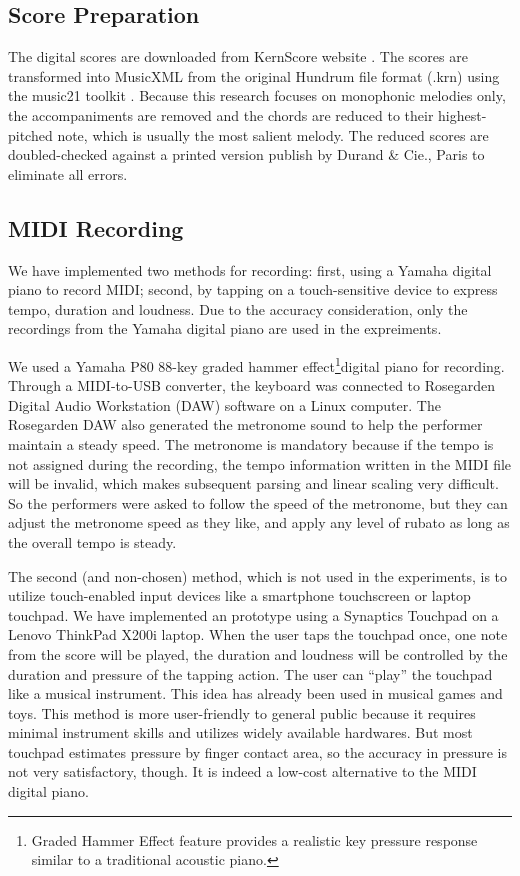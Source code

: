 \subsection{Score Preparation}

The digital scores are downloaded from KernScore website \cite{KernScores}. The  scores are transformed into MusicXML from the original Hundrum file format (.krn) using the  music21 toolkit \cite{music21}. Because this research focuses on monophonic melodies only, the accompaniments are removed and the chords are reduced to their highest-pitched note, which is usually the most salient melody. The reduced scores are doubled-checked against a printed version publish by Durand \& Cie., Paris \cite{Clementi1915} to eliminate all errors. %

\subsection{MIDI Recording}
We have implemented two methods for recording: first, using a Yamaha digital piano to record MIDI; second, by tapping on a touch-sensitive device to express tempo, duration and loudness. Due to the accuracy consideration, only the recordings from the Yamaha digital piano are used in the expreiments.


We used a Yamaha P80 88-key graded hammer effect\footnote{Graded Hammer Effect feature provides a realistic key pressure response similar to a traditional acoustic piano.}digital piano for recording. Through a MIDI-to-USB converter, the keyboard was connected to Rosegarden Digital Audio Workstation (DAW) software on a Linux computer. The Rosegarden DAW also generated the metronome sound to help the performer maintain a steady speed. The metronome is mandatory because if the tempo is not assigned during the recording, the tempo information written in the MIDI file will be invalid, which makes subsequent parsing and linear scaling very difficult. So the performers were asked to follow the speed of the metronome, but they can adjust the metronome speed as they like, and apply any level of rubato as long as the overall tempo is steady. 

The second (and non-chosen) method, which is not used in the experiments, is to utilize touch-enabled input devices like a smartphone touchscreen or laptop touchpad. We have implemented an prototype using a Synaptics Touchpad on a Lenovo ThinkPad X200i laptop. When the user taps the touchpad once, one note from the score will be played, the duration and loudness will be controlled by the duration and pressure of the tapping action. The user can \enquote{play} the touchpad like a musical instrument. This idea has already been used in musical games and toys. This method is more user-friendly to general public because it requires minimal instrument skills and utilizes widely available hardwares. But most touchpad estimates pressure by finger contact area, so the accuracy in pressure is not very satisfactory, though. It is indeed a low-cost alternative to the MIDI digital piano.

